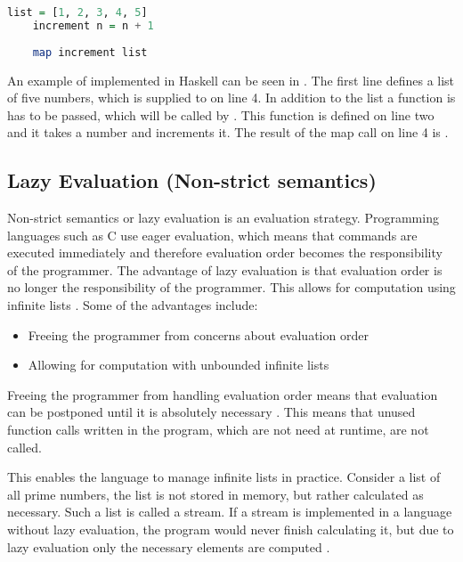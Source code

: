 \begin{lstlisting}[language=haskell, caption={Higher Order Functions in Haskell}, label={lst:haskell-map}]
    list = [1, 2, 3, 4, 5]
    increment n = n + 1
    
    map increment list
\end{lstlisting}

An example of  implemented in Haskell can be seen in . The first line defines a list of five numbers, which is supplied to  on line 4. In addition to the list a function is has to be passed, which will be called by . This function is defined on line two and it takes a number and increments it. The result of the map call on line 4 is \ttt{[2, 3, 4, 5, 6]}.

\subsection{Lazy Evaluation (Non-strict semantics)}
Non-strict semantics or lazy evaluation is an evaluation strategy. Programming languages such as C use eager evaluation, which means that commands are executed immediately and therefore evaluation order becomes the responsibility of the programmer. The advantage of lazy evaluation is that evaluation order is no longer the responsibility of the programmer. This allows for computation using infinite lists \cite{hudak1989conception}. Some of the advantages include:
\begin{itemize}
    \item Freeing the programmer from concerns about evaluation order
    \item Allowing for computation with unbounded infinite lists
\end{itemize}

Freeing the programmer from handling evaluation order means that evaluation can be postponed until it is absolutely necessary \cite{hudak1989conception}. This means that unused function calls written in the program, which are not need at runtime, are not called.

This enables the language to manage infinite lists in practice. Consider a list of all prime numbers, the list is not stored in memory, but rather calculated as necessary. Such a list is called a stream. If a stream is implemented in a language without lazy evaluation, the program would never finish calculating it, but due to lazy evaluation only the necessary elements are computed \cite{hughes1989functional}.

